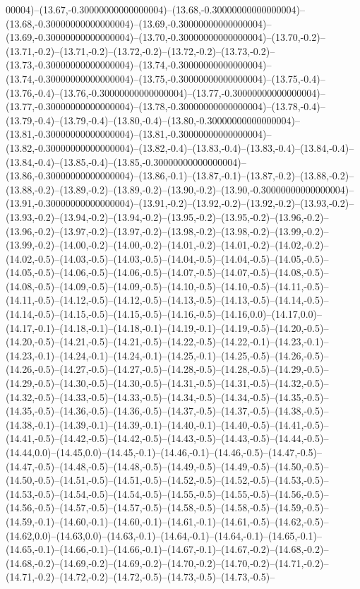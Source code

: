 00004)--(13.67,-0.30000000000000004)--(13.68,-0.30000000000000004)--(13.68,-0.30000000000000004)--(13.69,-0.30000000000000004)--(13.69,-0.30000000000000004)--(13.70,-0.30000000000000004)--(13.70,-0.2)--(13.71,-0.2)--(13.71,-0.2)--(13.72,-0.2)--(13.72,-0.2)--(13.73,-0.2)--(13.73,-0.30000000000000004)--(13.74,-0.30000000000000004)--(13.74,-0.30000000000000004)--(13.75,-0.30000000000000004)--(13.75,-0.4)--(13.76,-0.4)--(13.76,-0.30000000000000004)--(13.77,-0.30000000000000004)--(13.77,-0.30000000000000004)--(13.78,-0.30000000000000004)--(13.78,-0.4)--(13.79,-0.4)--(13.79,-0.4)--(13.80,-0.4)--(13.80,-0.30000000000000004)--(13.81,-0.30000000000000004)--(13.81,-0.30000000000000004)--(13.82,-0.30000000000000004)--(13.82,-0.4)--(13.83,-0.4)--(13.83,-0.4)--(13.84,-0.4)--(13.84,-0.4)--(13.85,-0.4)--(13.85,-0.30000000000000004)--(13.86,-0.30000000000000004)--(13.86,-0.1)--(13.87,-0.1)--(13.87,-0.2)--(13.88,-0.2)--(13.88,-0.2)--(13.89,-0.2)--(13.89,-0.2)--(13.90,-0.2)--(13.90,-0.30000000000000004)--(13.91,-0.30000000000000004)--(13.91,-0.2)--(13.92,-0.2)--(13.92,-0.2)--(13.93,-0.2)--(13.93,-0.2)--(13.94,-0.2)--(13.94,-0.2)--(13.95,-0.2)--(13.95,-0.2)--(13.96,-0.2)--(13.96,-0.2)--(13.97,-0.2)--(13.97,-0.2)--(13.98,-0.2)--(13.98,-0.2)--(13.99,-0.2)--(13.99,-0.2)--(14.00,-0.2)--(14.00,-0.2)--(14.01,-0.2)--(14.01,-0.2)--(14.02,-0.2)--(14.02,-0.5)--(14.03,-0.5)--(14.03,-0.5)--(14.04,-0.5)--(14.04,-0.5)--(14.05,-0.5)--(14.05,-0.5)--(14.06,-0.5)--(14.06,-0.5)--(14.07,-0.5)--(14.07,-0.5)--(14.08,-0.5)--(14.08,-0.5)--(14.09,-0.5)--(14.09,-0.5)--(14.10,-0.5)--(14.10,-0.5)--(14.11,-0.5)--(14.11,-0.5)--(14.12,-0.5)--(14.12,-0.5)--(14.13,-0.5)--(14.13,-0.5)--(14.14,-0.5)--(14.14,-0.5)--(14.15,-0.5)--(14.15,-0.5)--(14.16,-0.5)--(14.16,0.0)--(14.17,0.0)--(14.17,-0.1)--(14.18,-0.1)--(14.18,-0.1)--(14.19,-0.1)--(14.19,-0.5)--(14.20,-0.5)--(14.20,-0.5)--(14.21,-0.5)--(14.21,-0.5)--(14.22,-0.5)--(14.22,-0.1)--(14.23,-0.1)--(14.23,-0.1)--(14.24,-0.1)--(14.24,-0.1)--(14.25,-0.1)--(14.25,-0.5)--(14.26,-0.5)--(14.26,-0.5)--(14.27,-0.5)--(14.27,-0.5)--(14.28,-0.5)--(14.28,-0.5)--(14.29,-0.5)--(14.29,-0.5)--(14.30,-0.5)--(14.30,-0.5)--(14.31,-0.5)--(14.31,-0.5)--(14.32,-0.5)--(14.32,-0.5)--(14.33,-0.5)--(14.33,-0.5)--(14.34,-0.5)--(14.34,-0.5)--(14.35,-0.5)--(14.35,-0.5)--(14.36,-0.5)--(14.36,-0.5)--(14.37,-0.5)--(14.37,-0.5)--(14.38,-0.5)--(14.38,-0.1)--(14.39,-0.1)--(14.39,-0.1)--(14.40,-0.1)--(14.40,-0.5)--(14.41,-0.5)--(14.41,-0.5)--(14.42,-0.5)--(14.42,-0.5)--(14.43,-0.5)--(14.43,-0.5)--(14.44,-0.5)--(14.44,0.0)--(14.45,0.0)--(14.45,-0.1)--(14.46,-0.1)--(14.46,-0.5)--(14.47,-0.5)--(14.47,-0.5)--(14.48,-0.5)--(14.48,-0.5)--(14.49,-0.5)--(14.49,-0.5)--(14.50,-0.5)--(14.50,-0.5)--(14.51,-0.5)--(14.51,-0.5)--(14.52,-0.5)--(14.52,-0.5)--(14.53,-0.5)--(14.53,-0.5)--(14.54,-0.5)--(14.54,-0.5)--(14.55,-0.5)--(14.55,-0.5)--(14.56,-0.5)--(14.56,-0.5)--(14.57,-0.5)--(14.57,-0.5)--(14.58,-0.5)--(14.58,-0.5)--(14.59,-0.5)--(14.59,-0.1)--(14.60,-0.1)--(14.60,-0.1)--(14.61,-0.1)--(14.61,-0.5)--(14.62,-0.5)--(14.62,0.0)--(14.63,0.0)--(14.63,-0.1)--(14.64,-0.1)--(14.64,-0.1)--(14.65,-0.1)--(14.65,-0.1)--(14.66,-0.1)--(14.66,-0.1)--(14.67,-0.1)--(14.67,-0.2)--(14.68,-0.2)--(14.68,-0.2)--(14.69,-0.2)--(14.69,-0.2)--(14.70,-0.2)--(14.70,-0.2)--(14.71,-0.2)--(14.71,-0.2)--(14.72,-0.2)--(14.72,-0.5)--(14.73,-0.5)--(14.73,-0.5)--